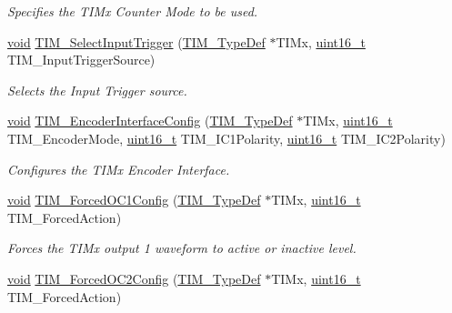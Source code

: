 \begin{DoxyCompactItemize}
\begin{DoxyCompactList}\small\item\em Specifies the T\+I\+Mx Counter Mode to be used. \end{DoxyCompactList}\item 
\hyperlink{usb__devapi_8h_afabf60e7f57651d6d595a02c75f07cd0}{void} \hyperlink{group___t_i_m___exported___functions_ga4252583c6ae8a73d6fc66f7e951dbc35}{T\+I\+M\+\_\+\+Select\+Input\+Trigger} (\hyperlink{struct_t_i_m___type_def}{T\+I\+M\+\_\+\+Type\+Def} $\ast$T\+I\+Mx, \hyperlink{_p_e___types_8h_a1f1825b69244eb3ad2c7165ddc99c956}{uint16\+\_\+t} T\+I\+M\+\_\+\+Input\+Trigger\+Source)
\begin{DoxyCompactList}\small\item\em Selects the Input Trigger source. \end{DoxyCompactList}\item 
\hyperlink{usb__devapi_8h_afabf60e7f57651d6d595a02c75f07cd0}{void} \hyperlink{group___t_i_m___exported___functions_ga0fc7e76c47a3bd1ba1ebc71427832b51}{T\+I\+M\+\_\+\+Encoder\+Interface\+Config} (\hyperlink{struct_t_i_m___type_def}{T\+I\+M\+\_\+\+Type\+Def} $\ast$T\+I\+Mx, \hyperlink{_p_e___types_8h_a1f1825b69244eb3ad2c7165ddc99c956}{uint16\+\_\+t} T\+I\+M\+\_\+\+Encoder\+Mode, \hyperlink{_p_e___types_8h_a1f1825b69244eb3ad2c7165ddc99c956}{uint16\+\_\+t} T\+I\+M\+\_\+\+I\+C1\+Polarity, \hyperlink{_p_e___types_8h_a1f1825b69244eb3ad2c7165ddc99c956}{uint16\+\_\+t} T\+I\+M\+\_\+\+I\+C2\+Polarity)
\begin{DoxyCompactList}\small\item\em Configures the T\+I\+Mx Encoder Interface. \end{DoxyCompactList}\item 
\hyperlink{usb__devapi_8h_afabf60e7f57651d6d595a02c75f07cd0}{void} \hyperlink{group___t_i_m___exported___functions_ga4f58c12e6493a0d8b9555c9097b831d6}{T\+I\+M\+\_\+\+Forced\+O\+C1\+Config} (\hyperlink{struct_t_i_m___type_def}{T\+I\+M\+\_\+\+Type\+Def} $\ast$T\+I\+Mx, \hyperlink{_p_e___types_8h_a1f1825b69244eb3ad2c7165ddc99c956}{uint16\+\_\+t} T\+I\+M\+\_\+\+Forced\+Action)
\begin{DoxyCompactList}\small\item\em Forces the T\+I\+Mx output 1 waveform to active or inactive level. \end{DoxyCompactList}\item 
\hyperlink{usb__devapi_8h_afabf60e7f57651d6d595a02c75f07cd0}{void} \hyperlink{group___t_i_m___exported___functions_ga3d2902b6fbab8dd55cd531055ffcc63d}{T\+I\+M\+\_\+\+Forced\+O\+C2\+Config} (\hyperlink{struct_t_i_m___type_def}{T\+I\+M\+\_\+\+Type\+Def} $\ast$T\+I\+Mx, \hyperlink{_p_e___types_8h_a1f1825b69244eb3ad2c7165ddc99c956}{uint16\+\_\+t} T\+I\+M\+\_\+\+Forced\+Action)

\end{DoxyCompactItemize}
